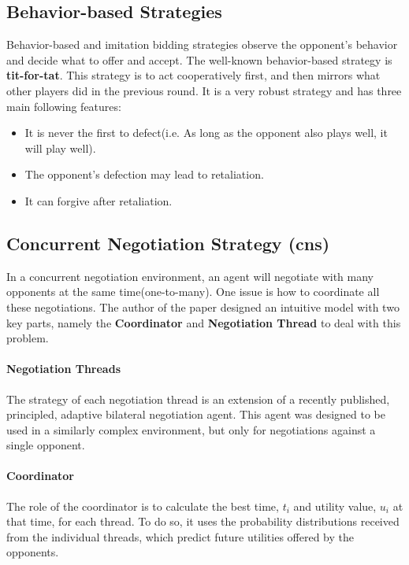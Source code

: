 \subsection{Behavior-based Strategies}
Behavior-based and imitation bidding strategies observe the opponent's behavior and decide what to offer and accept. The well-known behavior-based strategy is \textbf{tit-for-tat}. This strategy is to act cooperatively first, and then mirrors what other players did in the previous round.
It is a very robust strategy and has three main following features\parencite{Baarslag2013, chang2020multiissue}:
\begin{itemize}
\item It is never the first to defect(i.e. As long as the opponent also plays well, it will play well).
\item The opponent's defection may lead to retaliation.
\item It can forgive after retaliation.
\end{itemize}

\subsection{Concurrent Negotiation Strategy (\gls{cns})}
In a concurrent negotiation environment, an agent will negotiate with many opponents at the same time(one-to-many). One issue is how to coordinate all these negotiations. The author of the paper \parencite{Williams12Concurrent} designed an intuitive model with two key parts, namely the \textbf{Coordinator} and \textbf{Negotiation Thread} to deal with this problem.

\paragraph{Negotiation Threads} The strategy of each negotiation thread is an extension of a recently published, principled, adaptive bilateral negotiation agent. This agent was designed to be used in a similarly complex environment, but only for negotiations against a single opponent.

\paragraph{Coordinator} The role of the coordinator is to calculate the best time, $t_i$ and utility value, $u_i$ at that time, for each thread. To do so, it uses the probability distributions received from the individual threads, which predict future utilities offered by the opponents.

